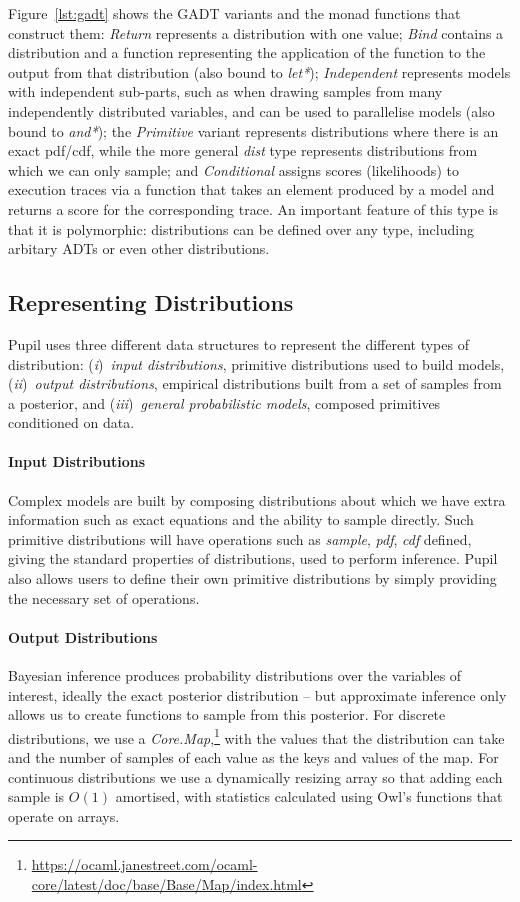 \documentclass[sigconf]{acmart}
\newcommand{\one}{({\em i})\/}
\newcommand{\two}{({\em ii})\/}
\newcommand{\three}{({\em iii})\/}
\newcommand{\pupil}{Pupil\xspace}
\begin{document}
Figure~\ref{lst:gadt} shows the GADT variants and the monad functions that construct them: \emph{Return} represents a distribution with one value; \emph{Bind} contains a distribution and a function representing the application of the function to the output from that distribution (also bound to \emph{let*}); \emph{Independent} represents models with independent sub-parts, such as when drawing samples from many independently distributed variables, and can be used to parallelise models (also bound to \emph{and*}); the \emph{Primitive} variant represents distributions where there is an exact pdf/cdf, while the more general \emph{dist} type represents distributions from which we can only sample; and \emph{Conditional} assigns scores (likelihoods) to execution traces via a function that takes an element produced by a model and returns a score for the corresponding trace. An important feature of this type is that it is polymorphic: distributions can be defined over any type, including arbitary ADTs or even other distributions.

\subsection{Representing Distributions}
\pupil uses three different data structures to represent the different types of distribution: \one~\emph{input distributions}, primitive distributions used to build models, \two~\emph{output distributions}, empirical distributions built from a set of samples from a posterior, and \three~\emph{general probabilistic models}, composed primitives conditioned on data.

\paragraph{Input Distributions}
Complex models are built by composing distributions about which we have extra information such as exact equations and the ability to sample directly. Such primitive distributions will have operations such as \emph{sample}, \emph{pdf}, \emph{cdf} defined, giving the standard properties of distributions, used to perform inference. \pupil also allows users to define their own primitive distributions by simply providing the necessary set of operations.

\paragraph{Output Distributions}
Bayesian inference produces probability distributions over the variables of interest, ideally the exact posterior distribution -- but approximate inference only allows us to create functions to sample from this posterior. For discrete distributions, we use a \emph{Core.Map},\footnote{\url{https://ocaml.janestreet.com/ocaml-core/latest/doc/base/Base/Map/index.html}} with the values that the distribution can take and the number of samples of each value as the keys and values of the map. For continuous distributions we use a dynamically resizing array so that adding each sample is $O(1)$ amortised, with statistics calculated using Owl's functions that operate on arrays.
\end{document}
